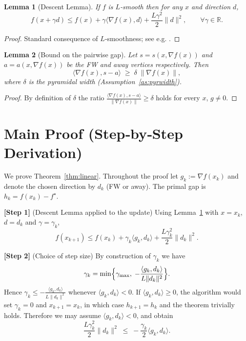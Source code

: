 \documentclass{article}
\newtheorem{lemma}{Lemma}
\begin{document}
\begin{lemma}[Descent Lemma]\label{lem:descent}
If $f$ is $L$‑smooth then for any $x$ and direction $d$,
\[
f(x+\gamma d)\le f(x)+\gamma\langle\nabla f(x),d\rangle+\frac{L\gamma^{2}}{2}\|d\|^{2},
\qquad\forall\gamma\in\mathbb{R}.
\]
\end{lemma}
\begin{proof}
Standard consequence of $L$‑smoothness; see e.g. \cite{Nesterov2004}.
\end{proof}

\begin{lemma}[Bound on the pairwise gap]\label{lem:pairgap}
Let $s=s(x,\nabla f(x))$ and $a=a(x,\nabla f(x))$ be the FW and away vertices respectively. Then
\[
\langle\nabla f(x),s-a\rangle\;\ge\;\delta\;\|\nabla f(x)\|,
\]
where $\delta$ is the pyramidal width (Assumption~\ref{as:pyrwidth}).
\end{lemma}
\begin{proof}
By definition of $\delta$ the ratio
$\frac{\langle\nabla f(x),s-a\rangle}{\|\nabla f(x)\|}\ge\delta$ holds for every $x$, $g\neq0$.
\end{proof}

\section*{Main Proof (Step‑by‑Step Derivation)}
We prove Theorem~\ref{thm:linear}.  Throughout the proof let $g_{k}:=\nabla f(x_{k})$ and denote the chosen direction by $d_{k}$ (FW or away).  The primal gap is $h_{k}=f(x_{k})-f^{\star}$.

\noindent\textbf{[Step 1]} (Descent Lemma applied to the update)  
Using Lemma~\ref{lem:descent} with $x=x_{k}$, $d=d_{k}$ and $\gamma=\gamma_{k}$,
\[
f(x_{k+1})\le f(x_{k})+\gamma_{k}\langle g_{k},d_{k}\rangle
               +\frac{L\gamma_{k}^{2}}{2}\|d_{k}\|^{2}. \tag{1}
\]

\noindent\textbf{[Step 2]} (Choice of step size)  
By construction of $\gamma_{k}$ we have
\[
\gamma_{k}= \min\Bigl\{\gamma_{\max},\;-\frac{\langle g_{k},d_{k}\rangle}{L\|d_{k}\|^{2}}\Bigr\}.
\]
Hence $\gamma_{k}\le-\frac{\langle g_{k},d_{k}\rangle}{L\|d_{k}\|^{2}}$ whenever $\langle g_{k},d_{k}\rangle<0$.  
If $\langle g_{k},d_{k}\rangle\ge0$, the algorithm would set $\gamma_{k}=0$ and $x_{k+1}=x_{k}$, in which case $h_{k+1}=h_{k}$ and the theorem trivially holds.  Therefore we may assume $\langle g_{k},d_{k}\rangle<0$, and obtain
\[
\frac{L\gamma_{k}^{2}}{2}\|d_{k}\|^{2}
\;\le\;-\frac{\gamma_{k}}{2}\langle g_{k},d_{k}\rangle . \tag{2}
\]
\end{document}
